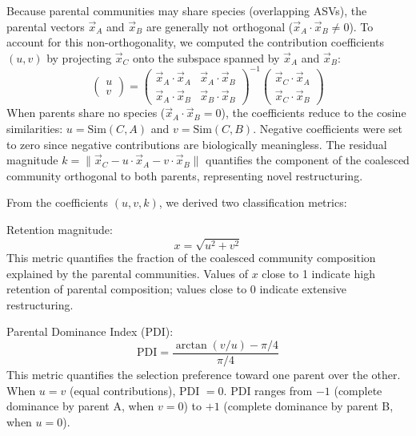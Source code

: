 Because parental communities may share species (overlapping ASVs), the parental vectors $\vec{x}_A$ and $\vec{x}_B$ are generally not orthogonal ($\vec{x}_A \cdot \vec{x}_B \neq 0$). To account for this non-orthogonality, we computed the contribution coefficients $(u, v)$ by projecting $\vec{x}_C$ onto the subspace spanned by $\vec{x}_A$ and $\vec{x}_B$:
\begin{equation}
\begin{pmatrix} u \\ v \end{pmatrix} = \begin{pmatrix} \vec{x}_A \cdot \vec{x}_A & \vec{x}_A \cdot \vec{x}_B \\ \vec{x}_A \cdot \vec{x}_B & \vec{x}_B \cdot \vec{x}_B \end{pmatrix}^{-1} \begin{pmatrix} \vec{x}_C \cdot \vec{x}_A \\ \vec{x}_C \cdot \vec{x}_B \end{pmatrix}
\end{equation}
When parents share no species ($\vec{x}_A \cdot \vec{x}_B = 0$), the coefficients reduce to the cosine similarities: $u = \text{Sim}(C, A)$ and $v = \text{Sim}(C, B)$. Negative coefficients were set to zero since negative contributions are biologically meaningless. The residual magnitude $k = \|\vec{x}_C - u \cdot \vec{x}_A - v \cdot \vec{x}_B\|$ quantifies the component of the coalesced community orthogonal to both parents, representing novel restructuring.

From the coefficients $(u, v, k)$, we derived two classification metrics:

Retention magnitude:
\begin{equation}
x = \sqrt{u^2 + v^2}
\end{equation}
This metric quantifies the fraction of the coalesced community composition explained by the parental communities. Values of $x$ close to 1 indicate high retention of parental composition; values close to 0 indicate extensive restructuring.

Parental Dominance Index (PDI):
\begin{equation}
\text{PDI} = \frac{\arctan(v/u) - \pi/4}{\pi/4}
\end{equation}
This metric quantifies the selection preference toward one parent over the other. When $u = v$ (equal contributions), PDI $= 0$. PDI ranges from $-1$ (complete dominance by parent A, when $v = 0$) to $+1$ (complete dominance by parent B, when $u = 0$).

